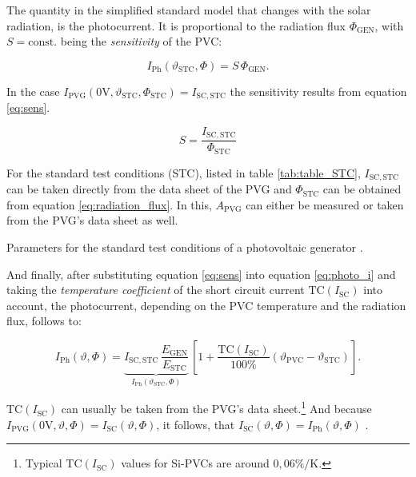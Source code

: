 The quantity in the simplified standard model that changes with the solar radiation, is the photocurrent. It is proportional to the radiation flux $\Phi_{\mathrm{GEN}}$, with $S = \mathrm{const.}$ being the \emph{sensitivity} of the PVC:
\begin{center}
	\begin{equation} \label{eq:photo_i}
		I_{\mathrm{Ph}}\left( \vartheta_{\mathrm{STC}}, \Phi \right) = S \, \Phi_{\mathrm{GEN}} \text{.}
	\end{equation}
\end{center}
In the case $I_{\mathrm{PVG}}\left(0\mathrm{V}, \vartheta_{\mathrm{STC}}, \Phi_{\mathrm{STC}}\right) = I_\mathrm{SC,STC}$ the sensitivity results from equation \ref{eq:sens}.
\begin{center}
	\begin{equation} \label{eq:sens}
		 S = \frac{I_\mathrm{SC,STC}}{\Phi_{\mathrm{STC}}}
	\end{equation}
\end{center}
For the standard test conditions (STC), listed in table \ref{tab:table_STC}, $I_\mathrm{SC,STC}$ can be taken directly from the data sheet of the PVG and $\Phi_{\mathrm{STC}}$ can be obtained from equation \ref{eq:radiation_flux}. In this, $A_\mathrm{PVG}$ can either be measured or taken from the PVG's data sheet as well.
\begin{table}[h!]
	\centering
	
	\caption{Parameters for the standard test conditions of a photovoltaic generator \cite{Mertens:2015}.}
	\label{tab:table_STC}
\end{table}
And finally, after substituting equation \ref{eq:sens} into equation \ref{eq:photo_i} and taking the \emph{temperature coefficient} of the short circuit current $\mathrm{TC}\left(I_{\mathrm{SC}}\right)$ into account, the photocurrent, depending on the PVC temperature and the radiation flux, follows to:
\begin{center}
	\begin{equation} \label{eq:i_ph_theta_phi}
		 I_{\mathrm{Ph}}\left( \vartheta, \Phi \right) = \underbrace{I_{\mathrm{SC,STC}} \, \frac{E_\mathrm{GEN}}{E_\mathrm{STC}}}_{I_{\mathrm{Ph}}\left( \vartheta_{\mathrm{STC}}, \Phi \right)} \, \left[ 1 + \frac{\mathrm{TC}\left(I_{\mathrm{SC}}\right)}{100\%} \left(\vartheta_{\mathrm{PVC}} - \vartheta_{\mathrm{STC}} \right) \right] \text{.}
	\end{equation}
\end{center}
$\mathrm{TC}\left(I_{\mathrm{SC}}\right)$ can usually be taken from the PVG's data sheet.\footnote{Typical $\mathrm{TC}\left(I_{\mathrm{SC}}\right)$ values for Si-PVCs are around $0,06 \% / \mathrm{K}$.} And because $I_{\mathrm{PVG}}\left( 0\mathrm{V}, \vartheta, \Phi \right) = I_{\mathrm{SC}}\left( \vartheta, \Phi \right)$, it follows, that $I_{\mathrm{SC}}\left( \vartheta, \Phi \right) = I_{\mathrm{Ph}}\left( \vartheta, \Phi \right)$ \cite{Mertens:2015, Tietze:2016, Wagner:2018}. 

